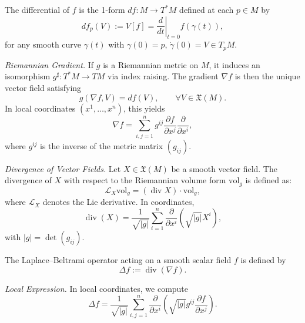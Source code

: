 \begin{definition}
The differential of $f$ is the 1-form $df : M \to T^*M$ defined at each $p \in M$ by
\begin{equation}
\label{eq:differential_def}
df_p(V) := V[f] = \left.\frac{d}{dt}\right|_{t=0} f(\gamma(t)),
\end{equation}
for any smooth curve $\gamma(t)$ with $\gamma(0) = p$, $\dot{\gamma}(0) = V \in T_p M$.
\end{definition}

\textit{Riemannian Gradient.} If $g$ is a Riemannian metric on $M$, it induces an isomorphism $g^\sharp : T^*M \to TM$ via index raising. The gradient $\nabla f$ is then the unique vector field satisfying
\begin{equation}
\label{eq:gradient_def}
g(\nabla f, V) = df(V), \qquad \forall V \in \mathfrak{X}(M).
\end{equation}
In local coordinates $(x^1, \dots, x^n)$, this yields
\begin{equation}
\label{eq:gradient_local}
\nabla f = \sum_{i,j=1}^n g^{ij} \frac{\partial f}{\partial x^j} \frac{\partial}{\partial x^i},
\end{equation}
where $g^{ij}$ is the inverse of the metric matrix $(g_{ij})$.

\textit{Divergence of Vector Fields.} Let $X \in \mathfrak{X}(M)$ be a smooth vector field. The divergence of $X$ with respect to the Riemannian volume form $\mathrm{vol}_g$ is defined as:
\begin{equation}
\label{eq:divergence}
\mathcal{L}_X \mathrm{vol}_g = (\operatorname{div} X) \cdot \mathrm{vol}_g,
\end{equation}
where $\mathcal{L}_X$ denotes the Lie derivative. In coordinates,
\begin{equation}
\label{eq:div_local}
\operatorname{div}(X) = \frac{1}{\sqrt{|g|}} \sum_{i=1}^n \frac{\partial}{\partial x^i} \left( \sqrt{|g|} X^i \right),
\end{equation}
with $|g| = \det(g_{ij})$.

\begin{definition}
The Laplace--Beltrami operator acting on a smooth scalar field $f$ is defined by
\begin{equation}
\label{eq:laplace_beltrami}
\Delta f := \operatorname{div}(\nabla f).
\end{equation}
\end{definition}

\textit{Local Expression.} In local coordinates, we compute
\begin{equation}
\label{eq:laplace_beltrami_local}
\Delta f = \frac{1}{\sqrt{|g|}} \sum_{i,j=1}^n \frac{\partial}{\partial x^i} \left( \sqrt{|g|} g^{ij} \frac{\partial f}{\partial x^j} \right).
\end{equation}


